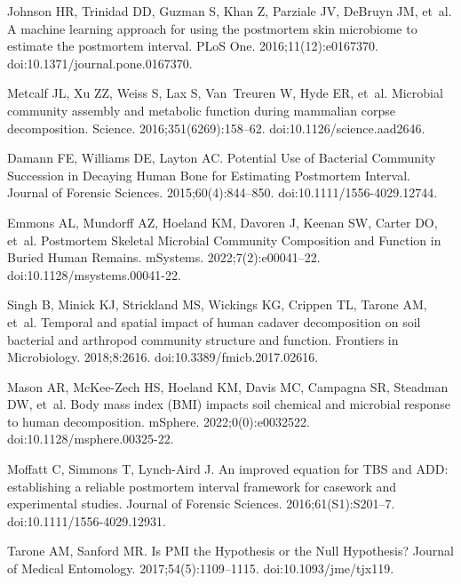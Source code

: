 \documentclass[
  10pt,
  letterpaper,
]{article}
\begin{document}
\begin{thebibliography}{10}
  Johnson HR, Trinidad DD, Guzman S, Khan Z, Parziale JV, DeBruyn JM, et~al.
  \newblock A machine learning approach for using the postmortem skin microbiome
    to estimate the postmortem interval.
  \newblock PLoS One. 2016;11(12):e0167370.
  \newblock doi:{10.1371/journal.pone.0167370}.
  
  Metcalf JL, Xu ZZ, Weiss S, Lax S, Van~Treuren W, Hyde ER, et~al.
  \newblock Microbial community assembly and metabolic function during mammalian
    corpse decomposition.
  \newblock Science. 2016;351(6269):158--62.
  \newblock doi:{10.1126/science.aad2646}.
  
  Damann FE, Williams DE, Layton AC.
  \newblock Potential {Use} of {Bacterial} {Community} {Succession} in {Decaying}
    {Human} {Bone} for {Estimating} {Postmortem} {Interval}.
  \newblock Journal of Forensic Sciences. 2015;60(4):844--850.
  \newblock doi:{10.1111/1556-4029.12744}.
  
  Emmons AL, Mundorff AZ, Hoeland KM, Davoren J, Keenan SW, Carter DO, et~al.
  \newblock Postmortem {Skeletal} {Microbial} {Community} {Composition} and
    {Function} in {Buried} {Human} {Remains}.
  \newblock mSystems. 2022;7(2):e00041--22.
  \newblock doi:{10.1128/msystems.00041-22}.
  
  Singh B, Minick KJ, Strickland MS, Wickings KG, Crippen TL, Tarone AM, et~al.
  \newblock Temporal and spatial impact of human cadaver decomposition on soil
    bacterial and arthropod community structure and function.
  \newblock Frontiers in Microbiology. 2018;8:2616.
  \newblock doi:{10.3389/fmicb.2017.02616}.
  
  Mason AR, McKee-Zech HS, Hoeland KM, Davis MC, Campagna SR, Steadman DW, et~al.
  \newblock Body mass index ({BMI}) impacts soil chemical and microbial response
    to human decomposition.
  \newblock mSphere. 2022;0(0):e0032522.
  \newblock doi:{10.1128/msphere.00325-22}.
  
  Moffatt C, Simmons T, Lynch-Aird J.
  \newblock An improved equation for {TBS} and {ADD}: establishing a reliable
    postmortem interval framework for casework and experimental studies.
  \newblock Journal of Forensic Sciences. 2016;61(S1):S201--7.
  \newblock doi:{10.1111/1556-4029.12931}.
  
  Tarone AM, Sanford MR.
  \newblock Is {PMI} the {Hypothesis} or the {Null} {Hypothesis}?
  \newblock Journal of Medical Entomology. 2017;54(5):1109--1115.
  \newblock doi:{10.1093/jme/tjx119}.
  

\end{thebibliography}
\end{document}
